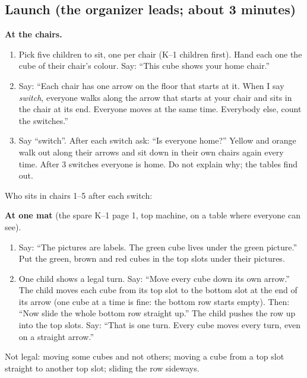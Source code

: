 \documentclass[11pt,letterpaper]{extarticle}
\begin{document}
\subsection{Launch (the organizer leads; about 3 minutes)}
\textbf{At the chairs.}
\begin{enumerate}
\item Pick five children to sit, one per chair (K--1 children first). Hand each one the cube of their chair's colour. Say: ``This cube shows your home chair.''
\item Say: ``Each chair has one arrow on the floor that starts at it. When I say \emph{switch}, everyone walks along the arrow that starts at your chair and sits in the chair at its end. Everyone moves at the same time. Everybody else, count the switches.''
\item Say ``switch''. After each switch ask: ``Is everyone home?'' Yellow and orange walk out along their arrows and sit down in their own chairs again every time. After 3 switches everyone is home. Do not explain why; the tables find out.
\end{enumerate}
Who sits in chairs 1--5 after each switch:\\
\LaunchRows

\textbf{At one mat} (the spare K--1 page 1, top machine, on a table where everyone can see).
\begin{enumerate}[resume]
\item Say: ``The pictures are labels. The green cube lives under the green picture.'' Put the green, brown and red cubes in the top slots under their pictures.
\item One child shows a legal turn. Say: ``Move every cube down its own arrow.'' The child moves each cube from its top slot to the bottom slot at the end of its arrow (one cube at a time is fine: the bottom row starts empty). Then: ``Now slide the whole bottom row straight up.'' The child pushes the row up into the top slots. Say: ``That is one turn. Every cube moves every turn, even on a straight arrow.''
\end{enumerate}
Not legal: moving some cubes and not others; moving a cube from a top slot straight to another top slot; sliding the row sideways.
\end{document}
